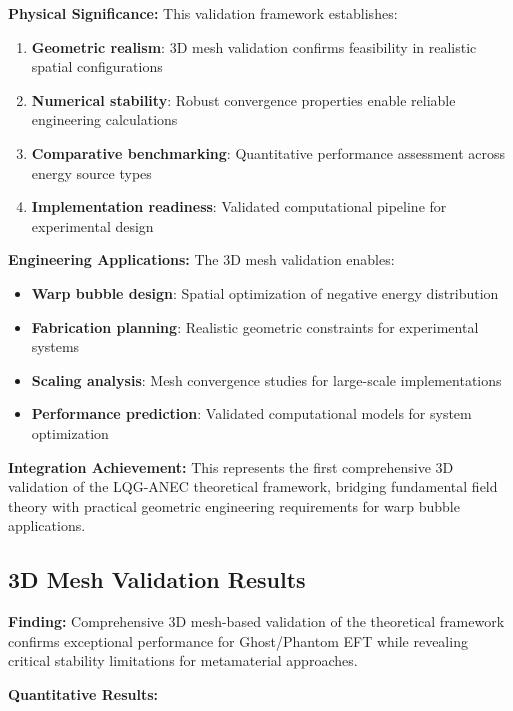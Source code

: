 \documentclass[11pt]{article}
\begin{document}
\textbf{Physical Significance:}
This validation framework establishes:
\begin{enumerate}
    \item \textbf{Geometric realism}: 3D mesh validation confirms feasibility in realistic spatial configurations
    \item \textbf{Numerical stability}: Robust convergence properties enable reliable engineering calculations
    \item \textbf{Comparative benchmarking}: Quantitative performance assessment across energy source types
    \item \textbf{Implementation readiness}: Validated computational pipeline for experimental design
\end{enumerate}

\textbf{Engineering Applications:}
The 3D mesh validation enables:
\begin{itemize}
    \item \textbf{Warp bubble design}: Spatial optimization of negative energy distribution
    \item \textbf{Fabrication planning}: Realistic geometric constraints for experimental systems
    \item \textbf{Scaling analysis}: Mesh convergence studies for large-scale implementations
    \item \textbf{Performance prediction}: Validated computational models for system optimization
\end{itemize}

\textbf{Integration Achievement:} This represents the first comprehensive 3D validation of the LQG-ANEC theoretical framework, bridging fundamental field theory with practical geometric engineering requirements for warp bubble applications.

\subsection{3D Mesh Validation Results}

\textbf{Finding:} Comprehensive 3D mesh-based validation of the theoretical framework confirms exceptional performance for Ghost/Phantom EFT while revealing critical stability limitations for metamaterial approaches.

\textbf{Quantitative Results:}
\end{document}
